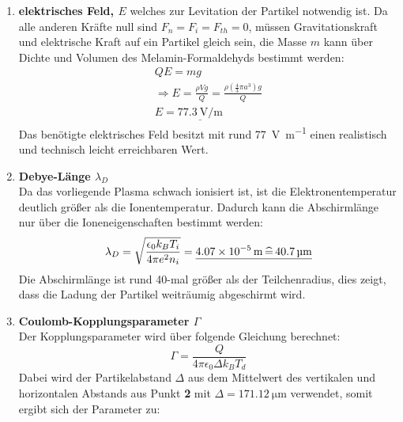 \documentclass[12pt,a4paper,ngerman]{article}
\begin{document}
\begin{enumerate}[font=\bfseries]
\begin{enumerate}[font=\bfseries, label=\alph*)]
\begin{equation}
			\end{equation}
		Durch einsetzten aller Werte ist die mittlere Ladung:
		\begin{equation}
			|Q| = \underline{\SI{5012}{\elemtLad} \, \widehat{=} \, \SI{8.027E-16}{\coulomb}}
		\end{equation}
		Ein Teilchen im Plasma trägt die Ladung von etwa \SI{5000}{\elemtLad}, angesichts der Größe der Partikel von \SI{1}{\micro \meter} scheint dieser Wert gut zu passen.
	    \item \textbf{elektrisches Feld, $E$} welches zur Levitation der Partikel notwendig ist. Da alle anderen Kräfte null sind $F_n = F_i = F_{th} = 0$, müssen Gravitationskraft und elektrische Kraft auf ein Partikel gleich sein, die Masse $m$ kann über Dichte und Volumen des Melamin-Formaldehyds bestimmt werden:
	    \begin{equation}
	    	\begin{split}
	    		Q E = m g \\
	    		\Rightarrow E = \frac{\rho V g}{Q} = \frac{\rho \left(\frac{4}{3} \pi a^3\right) g}{Q}\\
	    		E = \underline{\SI{77.3}{\volt \per \meter}}
	    	\end{split}
	    \end{equation}
    	Das benötigte elektrisches Feld besitzt mit rund \SI{77}{\volt \per \meter} einen realistisch und technisch leicht erreichbaren Wert.
	    \item \textbf{Debye-Länge $\lambda_D$}\\
	     Da das vorliegende Plasma schwach ionisiert ist, ist die Elektronentemperatur deutlich größer als die Ionentemperatur. Dadurch kann die Abschirmlänge nur über die Ioneneigenschaften bestimmt werden:
	    	    \begin{equation}
	    		\lambda_D = \sqrt{\frac{\epsilon_0 k_B T_i}{4 \pi e^2 n_i}} = \underline{\SI{4.07E-5}{\meter}  \, \widehat{=} \,  \SI{40.7}{\micro \meter}}
	    \end{equation}
	    Die Abschirmlänge ist rund 40-mal größer als der Teilchenradius, dies zeigt, dass die Ladung der Partikel weiträumig abgeschirmt wird. 
	    \item \textbf{Coulomb-Kopplungsparameter $\Gamma$}\\
	    Der Kopplungsparameter wird über folgende Gleichung berechnet:
	    \begin{equation}
	    	\Gamma = \frac{Q}{4 \pi \epsilon_0 \Delta k_B T_d}
	    \end{equation}
    	Dabei wird der Partikelabstand $\Delta$ aus dem Mittelwert des vertikalen und horizontalen Abstands aus Punkt \textbf{2} mit $\Delta =  \SI{171.12}{\micro \meter}$ verwendet, somit ergibt sich der Parameter zu:

\end{enumerate}
\end{enumerate}
\end{document}
